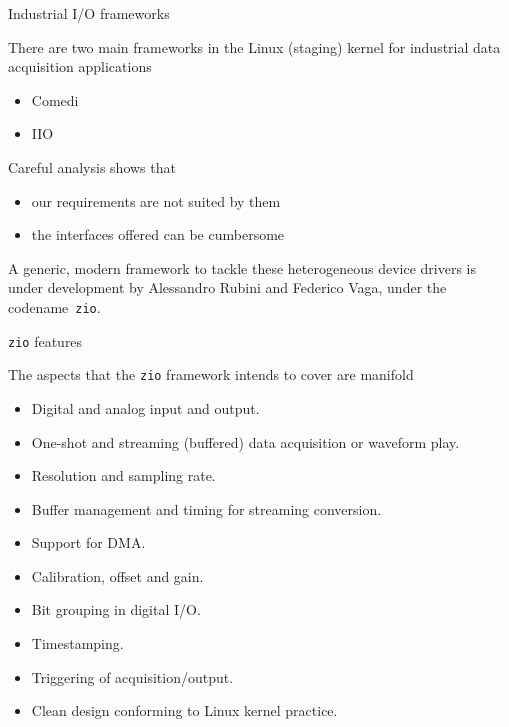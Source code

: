 \documentclass{beamer}
\begin{document}
\begin{frame}{Industrial I/O frameworks}

There are two main frameworks in the Linux (staging) kernel for
industrial data acquisition applications
\begin{itemize}
\item Comedi
\item IIO
\end{itemize}

Careful analysis shows that
\begin{itemize}
\item our requirements are not suited by them
\item the interfaces offered can be cumbersome
\end{itemize}

A generic, modern framework to tackle these heterogeneous device drivers
is under development by Alessandro Rubini and Federico Vaga, under the
codename~\texttt{zio}.

\end{frame}

\begin{frame}{\texttt{zio} features}

The aspects that the \texttt{zio} framework intends to cover are
manifold
\begin{itemize}
\item Digital and analog input and output.
\item One-shot and streaming (buffered) data acquisition or waveform play.
\item Resolution and sampling rate.
\item Buffer management and timing for streaming conversion.
\item Support for DMA.
\item Calibration, offset and gain.
\item Bit grouping in digital I/O.
\item Timestamping.
\item Triggering of acquisition/output.
\item Clean design conforming to Linux kernel practice.
\end{itemize}
\end{frame}
\end{document}
